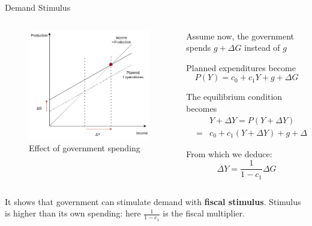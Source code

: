 \begin{frame}{Demand Stimulus}
\protect\hypertarget{demand-stimulus}{}
\begin{columns}[T]
\begin{column}{0.48\textwidth}
\begin{figure}
\centering
\includegraphics{assets/keynesian_cross_gvt.png}
\caption{Effect of government spending}
\end{figure}
\end{column}

\begin{column}{0.48\textwidth}
Assume now, the government spends \(g+\Delta G\) instead of \(g\)

Planned expenditures become \[P(Y) = c_0 + c_1 Y + g + \Delta G\]

The equilibrium condition becomes \begin{eqnarray*}
& & Y + \Delta Y  =  P(Y+\Delta Y) \\
             & = & c_0 + c_1 ( Y + \Delta Y) + g + \Delta G
\end{eqnarray*}

From which we deduce: \[\Delta Y = \frac{1}{1-c_1} \Delta G\]
\end{column}
\end{columns}

It shows that government can stimulate demand with \textbf{fiscal
stimulus}. Stimulus is higher than its own spending: here
\(\frac{1}{1-c_1}\) is the fiscal multiplier.
\end{frame}

